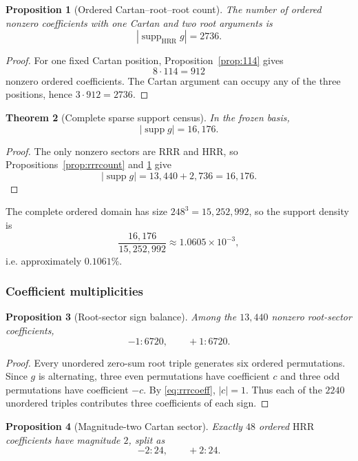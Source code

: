 \documentclass[11pt]{article}
\newtheorem{theorem}{Theorem}[section]
\newtheorem{proposition}[theorem]{Proposition}
\theoremstyle{definition}
\theoremstyle{remark}
\newcommand{\supp}{\operatorname{supp}}
\newcommand{\RRR}{\mathrm{RRR}}
\newcommand{\HRR}{\mathrm{HRR}}
\begin{document}
\begin{proposition}[Ordered Cartan--root--root count]\label{prop:hrrcount}
The number of ordered nonzero coefficients with one Cartan and two root arguments is
\[
|\supp_{\HRR}g|=2736.
\]
\end{proposition}

\begin{proof}
For one fixed Cartan position, Proposition~\ref{prop:114} gives
\[
8\cdot114=912
\]
nonzero ordered coefficients.  The Cartan argument can occupy any of the three positions, hence $3\cdot912=2736$.
\end{proof}

\begin{theorem}[Complete sparse support census]\label{thm:16176}
In the frozen basis,
\[
|\supp g|=16{,}176.
\]
\end{theorem}

\begin{proof}
The only nonzero sectors are $\RRR$ and $\HRR$, so Propositions~\ref{prop:rrrcount} and \ref{prop:hrrcount} give
\[
|\supp g|=13{,}440+2{,}736=16{,}176.
\]
\end{proof}

The complete ordered domain has size $248^3=15{,}252{,}992$, so the support density is
\[
\frac{16{,}176}{15{,}252{,}992}
\approx 1.0605\times10^{-3},
\]
i.e. approximately $0.1061\%$.

\subsubsection{Coefficient multiplicities}

\begin{proposition}[Root-sector sign balance]\label{prop:rrrsigns}
Among the $13{,}440$ nonzero root-sector coefficients,
\[
-1:6720,
\qquad
+1:6720.
\]
\end{proposition}

\begin{proof}
Every unordered zero-sum root triple generates six ordered permutations.  Since $g$ is alternating, three even permutations have coefficient $c$ and three odd permutations have coefficient $-c$.  By \eqref{eq:rrrcoeff}, $|c|=1$.  Thus each of the $2240$ unordered triples contributes three coefficients of each sign.
\end{proof}

\begin{proposition}[Magnitude-two Cartan sector]\label{prop:mag2}
Exactly $48$ ordered $\HRR$ coefficients have magnitude $2$, split as
\[
-2:24,
\qquad
+2:24.
\]
\end{proposition}
\end{document}
